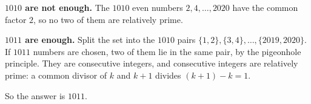 \textbf{$1010$ are not enough.} The $1010$ even numbers $2,4,\dots,2020$ have the common factor $2$, so no two of them are relatively prime.

\textbf{$1011$ are enough.} Split the set into the $1010$ pairs $\{1,2\},\{3,4\},\dots,\{2019,2020\}$. If $1011$ numbers are chosen, two of them lie in the same pair, by the pigeonhole principle. They are consecutive integers, and consecutive integers are relatively prime: a common divisor of $k$ and $k+1$ divides $(k+1)-k=1$.

So the answer is $\boxed{1011}$.
